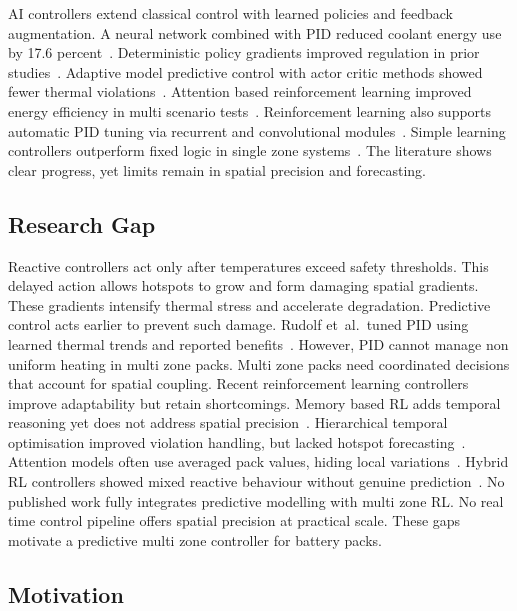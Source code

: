 \documentclass{article}
\begin{document}
AI controllers extend classical control with learned policies and feedback augmentation.
A neural network combined with PID reduced coolant energy use by 17.6 percent~\cite{Batteries2023}.
Deterministic policy gradients improved regulation in prior studies~\cite{ESWA2025}.
Adaptive model predictive control with actor critic methods showed fewer thermal violations~\cite{Wu2025}.
Attention based reinforcement learning improved energy efficiency in multi scenario tests~\cite{Cao2025}.
Reinforcement learning also supports automatic PID tuning via recurrent and convolutional modules~\cite{Rudolf2024}.
Simple learning controllers outperform fixed logic in single zone systems~\cite{11017253}.
The literature shows clear progress, yet limits remain in spatial precision and forecasting.

\subsection{Research Gap}

Reactive controllers act only after temperatures exceed safety thresholds.
This delayed action allows hotspots to grow and form damaging spatial gradients.
These gradients intensify thermal stress and accelerate degradation.
Predictive control acts earlier to prevent such damage.
Rudolf et~al.\ tuned PID using learned thermal trends and reported benefits~\cite{Rudolf2024}.
However, PID cannot manage non uniform heating in multi zone packs.
Multi zone packs need coordinated decisions that account for spatial coupling.
Recent reinforcement learning controllers improve adaptability but retain shortcomings.
Memory based RL adds temporal reasoning yet does not address spatial precision~\cite{Huang2022}.
Hierarchical temporal optimisation improved violation handling, but lacked hotspot forecasting~\cite{Wu2025}.
Attention models often use averaged pack values, hiding local variations~\cite{Cao2025}.
Hybrid RL controllers showed mixed reactive behaviour without genuine prediction~\cite{Rudolf2024}.
No published work fully integrates predictive modelling with multi zone RL\@.
No real time control pipeline offers spatial precision at practical scale.
These gaps motivate a predictive multi zone controller for battery packs.

\subsection{Motivation}
\end{document}

